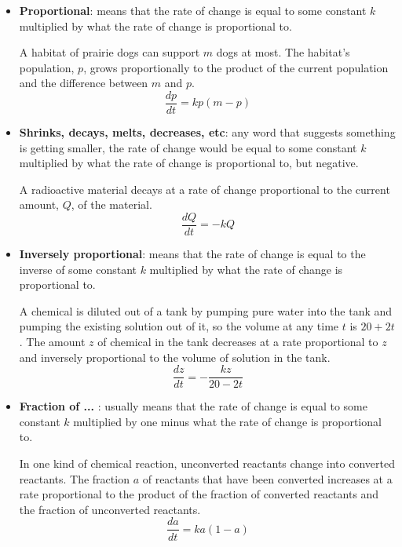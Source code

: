 \documentclass[12pt]{article}
\begin{document}
            \begin{itemize}
                \item \textbf{Proportional}: means that the rate of change is equal to some constant $k$ multiplied by what the rate of change is proportional to.
                \bigskip

                \noindent A habitat of prairie dogs can support $m$ dogs at most. The habitat's population, $p$, grows proportionally to the product of the current population and the difference between $m$ and $p$.
                \[ \frac{dp}{dt} = kp(m-p) \]

                \item \textbf{Shrinks, decays, melts, decreases, etc}: any word that suggests something is getting smaller, the rate of change would be equal to some constant $k$ multiplied by what the rate of change is proportional to, but negative.
                \bigskip

                \noindent A radioactive material decays at a rate of change proportional to the current amount, $Q$, of the material.
                \[ \frac{dQ}{dt} = -kQ \]

                \item \textbf{Inversely proportional}: means that the rate of change is equal to the inverse of some constant $k$ multiplied by what the rate of change is proportional to.
                \bigskip

                \noindent A chemical is diluted out of a tank by pumping pure water into the tank and pumping the existing solution out of it, so the volume at any time $t$ is $20+2t$. The amount $z$ of chemical in the tank decreases at a rate proportional to $z$ and inversely proportional to the volume of solution in the tank.
                \[ \frac{dz}{dt} = -\frac{kz}{20-2t} \]

                \item \textbf{Fraction of ... }: usually means that the rate of change is equal to some constant $k$ multiplied by one minus what the rate of change is proportional to.
                \bigskip

                \noindent In one kind of chemical reaction, unconverted reactants change into converted reactants. The fraction $a$ of reactants that have been converted increases at a rate proportional to the product of the fraction of converted reactants and the fraction of unconverted reactants.
                \[ \frac{da}{dt} = ka(1-a) \]
            \end{itemize}
\end{document}
